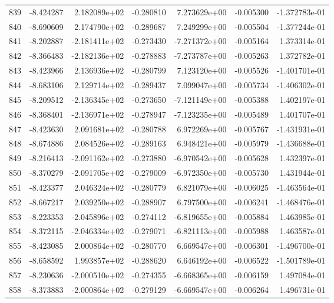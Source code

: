\begin{tabular}{rrrrrrr}
 839 &  -8.424287 &  2.182089e+02 & -0.280810 &  7.273629e+00 &   -0.005300 & -1.372783e-01 \\
 840 &  -8.690609 &  2.174790e+02 & -0.289687 &  7.249299e+00 &   -0.005504 & -1.377244e-01 \\
 841 &  -8.202887 & -2.181411e+02 & -0.273430 & -7.271372e+00 &   -0.005164 &  1.373314e-01 \\
 842 &  -8.366483 & -2.182136e+02 & -0.278883 & -7.273787e+00 &   -0.005263 &  1.372782e-01 \\
 843 &  -8.423966 &  2.136936e+02 & -0.280799 &  7.123120e+00 &   -0.005526 & -1.401701e-01 \\
 844 &  -8.683106 &  2.129714e+02 & -0.289437 &  7.099047e+00 &   -0.005734 & -1.406302e-01 \\
 845 &  -8.209512 & -2.136345e+02 & -0.273650 & -7.121149e+00 &   -0.005388 &  1.402197e-01 \\
 846 &  -8.368401 & -2.136971e+02 & -0.278947 & -7.123235e+00 &   -0.005489 &  1.401707e-01 \\
 847 &  -8.423630 &  2.091681e+02 & -0.280788 &  6.972269e+00 &   -0.005767 & -1.431931e-01 \\
 848 &  -8.674886 &  2.084526e+02 & -0.289163 &  6.948421e+00 &   -0.005979 & -1.436688e-01 \\
 849 &  -8.216413 & -2.091162e+02 & -0.273880 & -6.970542e+00 &   -0.005628 &  1.432397e-01 \\
 850 &  -8.370279 & -2.091705e+02 & -0.279009 & -6.972350e+00 &   -0.005730 &  1.431944e-01 \\
 851 &  -8.423377 &  2.046324e+02 & -0.280779 &  6.821079e+00 &   -0.006025 & -1.463564e-01 \\
 852 &  -8.667217 &  2.039250e+02 & -0.288907 &  6.797500e+00 &   -0.006241 & -1.468476e-01 \\
 853 &  -8.223353 & -2.045896e+02 & -0.274112 & -6.819655e+00 &   -0.005884 &  1.463985e-01 \\
 854 &  -8.372115 & -2.046334e+02 & -0.279071 & -6.821113e+00 &   -0.005988 &  1.463587e-01 \\
 855 &  -8.423085 &  2.000864e+02 & -0.280770 &  6.669547e+00 &   -0.006301 & -1.496700e-01 \\
 856 &  -8.658592 &  1.993857e+02 & -0.288620 &  6.646192e+00 &   -0.006522 & -1.501789e-01 \\
 857 &  -8.230636 & -2.000510e+02 & -0.274355 & -6.668365e+00 &   -0.006159 &  1.497084e-01 \\
 858 &  -8.373883 & -2.000864e+02 & -0.279129 & -6.669547e+00 &   -0.006264 &  1.496731e-01 \\

\end{tabular}

